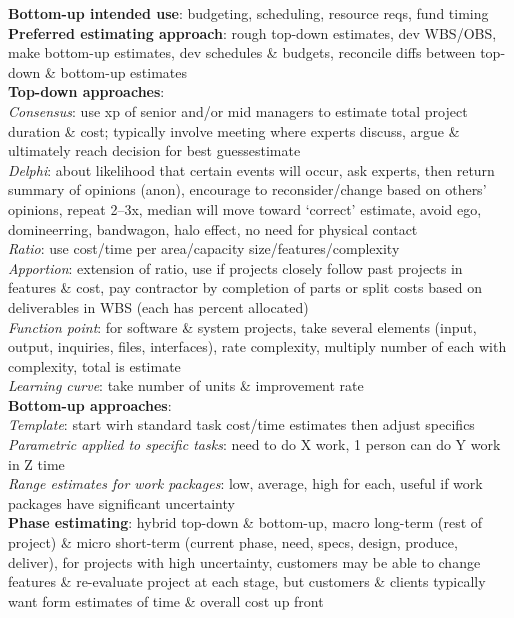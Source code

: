 \documentclass[a4paper]{article}
\begin{document}
\begin{multicols}{3}
        \textbf{Bottom-up intended use}: budgeting, scheduling, resource reqs, fund timing\\
        \textbf{Preferred estimating approach}: rough top-down estimates, dev WBS/OBS, make bottom-up estimates, dev schedules \& budgets, reconcile diffs between top-down \& bottom-up estimates\\
        \textbf{Top-down approaches}:\\
        \textit{Consensus}: use xp of senior and/or mid managers to estimate total project duration \& cost; typically involve meeting where experts discuss, argue \& ultimately reach decision for best guessestimate\\
        \textit{Delphi}: about likelihood that certain events will occur, ask experts, then return summary of opinions (anon), encourage to reconsider/change based on others' opinions, repeat 2--3x, median will move toward `correct' estimate, avoid ego, domineerring, bandwagon, halo effect, no need for physical contact\\
        \textit{Ratio}: use cost/time per area/capacity size/features/complexity\\
        \textit{Apportion}: extension of ratio, use if projects closely follow past projects in features \& cost, pay contractor by completion of parts or split costs based on deliverables in WBS (each has percent allocated)\\
        \textit{Function point}: for software \& system projects, take several elements (input, output, inquiries, files, interfaces), rate complexity, multiply number of each with complexity, total is estimate\\
        \textit{Learning curve}: take number of units \& improvement rate\\
        \textbf{Bottom-up approaches}:\\
        \textit{Template}: start wirh standard task cost/time estimates then adjust specifics\\
        \textit{Parametric applied to specific tasks}: need to do X work, 1 person can do Y work in Z time\\
        \textit{Range estimates for work packages}: low, average, high for each, useful if work packages have significant uncertainty\\
        \textbf{Phase estimating}: hybrid top-down \& bottom-up, macro long-term (rest of project) \& micro short-term (current phase, need, specs, design, produce, deliver), for projects with high uncertainty, customers may be able to change features \& re-evaluate project at each stage, but customers \& clients typically want form estimates of time \& overall cost up front\\

\end{multicols}
\end{document}
